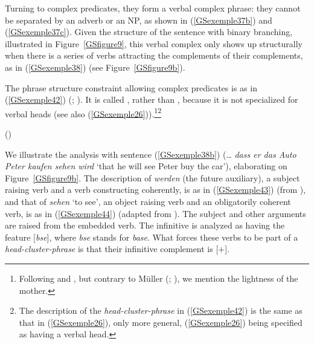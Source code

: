 
Turning to complex predicates, they form a verbal complex phrase: they cannot be separated by an adverb or an NP, as shown in (\ref{GSexemple37b}) and (\ref{GSexemple37c}). Given the structure of the  sentence with binary branching, illustrated in Figure~\ref{GSfigure9}, this verbal complex only shows up structurally when there is a series of verbs attracting the complements of their complements, as in (\ref{GSexemple38}) (see Figure~\ref{GSfigure9b}).

The phrase structure constraint allowing complex predicates is as in (\ref{GSexemple42})
(\citealt{MuellerCopula}; \citealt[39]{muller2018clause}). It is called ,
rather than , because it is not specialized for verbal heads (see also
(\ref{GSexemple26})).\footnote{Following \citet[]{HN94a} and \citet[]{dKM2001a}, but contrary to
  Müller (\citealt[]{Mueller2005c}; \citealt{muller2018clause}), we mention the lightness of the mother.}\footnote{The description of the \emph{head-cluster-phrase} in (\ref{GSexemple42}) is the same as that in (\ref{GSexemple26}), only more general, (\ref{GSexemple26}) being specified as having a verbal head.}  

\eas
\label{GSexemple42}\label{ex-head-cluster-phrase-German}%
 () \impl \\
\zs

We illustrate the analysis with sentence (\ref{GSexemple38b}) (\ldots{} \emph{dass er das Auto Peter
  kaufen sehen wird} `that he will see Peter buy the car’), elaborating on
Figure~\ref{GSfigure9b}. The description of \emph{werden} (the future auxiliary), a subject raising
verb and a verb constructing coherently, is as in (\ref{GSexemple43}) (from
\citealt[39]{muller2018clause}), and that of \emph{sehen} `to see', an object raising verb and an
obligatorily coherent verb, is as in (\ref{GSexemple44}) (adapted from
\citealt[102]{Mueller2002b}). The subject and other arguments are raised from the embedded verb. The
infinitive is analyzed as having the feature [\vform \textit{bse}], where \textit{bse} stands for
\emph{base}. What forces these verbs to be part of a \emph{head-cluster-phrase} is that their
infinitive complement is \mbox{[\light{}$+$]}.

